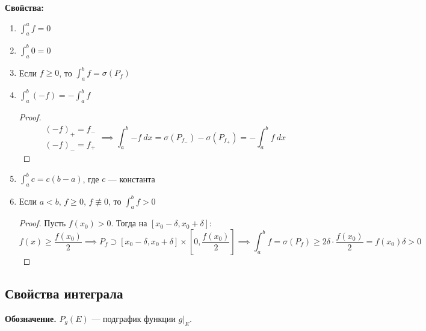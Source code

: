 \newpage
\textbf{Свойства:}
\begin{enumerate}
\item $\displaystyle \int_{a}^{a} f = 0$
\item $\displaystyle \int_{a}^{b} 0 = 0$
\item Если $f \geq 0$, то $\displaystyle \int_{a}^{b} f = \sigma(P_f)$
\item $\displaystyle \int_{a}^{b}(-f) = -\int_{a}^{b} f$
\begin{proof}
    \begin{equation*}
        \begin{gathered}
            (-f)_{+} = f_{-} \\
            (-f)_{-} = f_{+}
        \end{gathered}
        \implies
        \int_{{a}}^{{b}} {-f} \: d{x} =
        \sigma(P_{f_{-}}) - \sigma(P_{f_{+}}) =
        - \int_{{a}}^{{b}} {f} \: d{x}
    \end{equation*}
\end{proof}
\item $\displaystyle \int_{a}^{b} c = c(b - a)$, где $c$ --- константа
\item Если $a < b,\, f \geq 0, \, f \not \equiv 0$, то $\displaystyle \int_{a}^{b} f > 0$
\begin{proof}
    Пусть $f(x_0) > 0$. Тогда на $[x_0 - \delta, x_0 + \delta]$:
    \begin{equation*}
    f(x) \geq \frac{f(x_0)}{2}
    \implies
    P_f \supset [x_0 - \delta, x_0 + \delta] \times [0, \frac{f(x_0)}{2}] \implies
    \int_{a}^{b} f = \sigma(P_f) \geq 2\delta \cdot \frac{f(x_0)}{2} = f(x_0)\delta > 0
    \end{equation*}
\end{proof}
\end{enumerate}

\subsection{Свойства интеграла}

\textbf{Обозначение.}
$P_{g}(E)$ --- подграфик функции $g|_{E}$.

